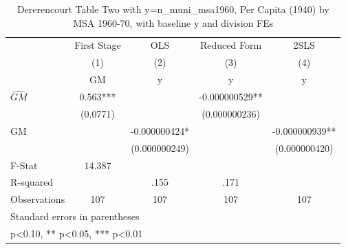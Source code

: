 \begin{table}[htbp]\centering
\def\sym#1{\ifmmode^{#1}\else\(^{#1}\)\fi}
\caption{Dererencourt Table Two with y=n\_muni\_msa1960, Per Capita (1940) by MSA 1960-70, with baseline y and division FEs}
\begin{tabular}{l*{4}{c}}
\toprule
                    & First Stage   &         OLS   &Reduced Form   &        2SLS   \\
                    &\multicolumn{1}{c}{(1)}&\multicolumn{1}{c}{(2)}&\multicolumn{1}{c}{(3)}&\multicolumn{1}{c}{(4)}\\
                    &\multicolumn{1}{c}{GM}&\multicolumn{1}{c}{y}&\multicolumn{1}{c}{y}&\multicolumn{1}{c}{y}\\
\midrule
$\hat{GM}$          &       0.563***&               &-0.000000529** &               \\
                    &    (0.0771)   &               &(0.000000236)   &               \\
\addlinespace
GM                  &               &-0.000000424*  &               &-0.000000939** \\
                    &               &(0.000000249)   &               &(0.000000420)   \\
\midrule
F-Stat              &      14.387   &               &               &               \\
R-squared           &               &        .155   &        .171   &               \\
Observations        &         107   &         107   &         107   &         107   \\
\bottomrule
\multicolumn{5}{l}{\footnotesize Standard errors in parentheses}\\
\multicolumn{5}{l}{\footnotesize * p<0.10, ** p<0.05, *** p<0.01}\\
\end{tabular}
\end{table}
